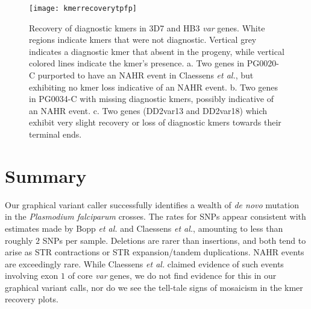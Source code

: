 \begin{landscape}
\begin{figure}[h!]
  \centering
    \texttt{[image: kmerrecoverytpfp]}
  \caption{Recovery of diagnostic kmers in 3D7 and HB3 \textit{var} genes.  White regions indicate kmers that were not diagnostic.  Vertical grey indicates a diagnostic kmer that absent in the progeny, while vertical colored lines indicate the kmer's presence.  a. Two genes in PG0020-C purported to have an NAHR event in Claessens \textit{et al.}, but exhibiting no kmer loss indicative of an NAHR event.  b. Two genes in PG0034-C with missing diagnostic kmers, possibly indicative of an NAHR event.  c. Two genes (DD2var13 and DD2var18) which exhibit very slight recovery or loss of diagnostic kmers towards their terminal ends.}
  \label{fig:kmerrecoverytpfp}
\end{figure}
\end{landscape}

\section{Summary}

Our graphical variant caller successfully identifies a wealth of \textit{de novo} mutation in the \textit{Plasmodium falciparum} crosses.  The rates for SNPs appear consistent with estimates made by Bopp \textit{et al.} and Claessens \textit{et al.}, amounting to less than roughly $2$ SNPs per sample.  Deletions are rarer than insertions, and both tend to arise as STR contractions or STR expansion/tandem duplications.  NAHR events are exceedingly rare.  While Claessens \textit{et al.} claimed evidence of such events involving exon $1$ of core \textit{var} genes, we do not find evidence for this in our graphical variant calls, nor do we see the tell-tale signs of mosaicism in the kmer recovery plots.
